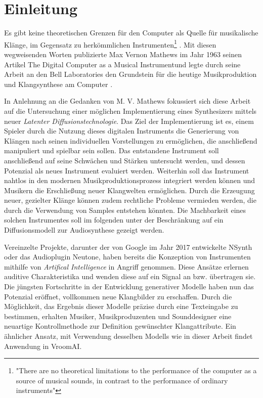 \documentclass[
  a4paper,  %
  twoside,  %
  bibliography=totoc,
  headsepline,
  cleardoublepage=empty,
  parskip=half,
  draft=false
]{scrbook}
\begin{document}
%
%


\chapter{Einleitung}
\label{sec:introduction}

\glqq Es gibt keine theoretischen Grenzen für den Computer als Quelle für musikalische Klänge, im Gegensatz zu herkömmlichen Instrumenten\grqq \footnote{"There are no theoretical limitations to the performance of the computer as a source of musical sounds, in contrast to the performance of ordinary instruments"} \cite{mathews_digital_1963}. Mit diesen wegweisenden Worten publizierte Max Vernon Mathews im Jahr 1963 seinen Artikel \glqq The Digital Computer as a Musical Instrument\grqq und legte durch seine Arbeit an den Bell Laboratories den Grundstein für die heutige Musikproduktion und Klangsynthese am Computer \cite{mathews_music_2004}.

In Anlehnung an die Gedanken von M. V. Mathews fokussiert sich diese Arbeit auf die Untersuchung einer möglichen Implementierung eines Synthesizers mittels neuer \emph{Latenter Diffusionstechnologie}. Das Ziel der Implementierung ist es, einem Spieler durch die Nutzung dieses digitalen Instruments die Generierung von Klängen nach seinen individuellen Vorstellungen zu ermöglichen, die anschließend manipuliert und spielbar sein sollen. Das entstandene Instrument soll anschließend auf seine Schwächen und Stärken untersucht werden, und dessen Potenzial als neues Instrument evaluiert werden. Weiterhin soll das Instrument nahtlos in den modernen Musikproduktionsprozess integriert werden können und Musikern die Erschließung neuer Klangwelten ermöglichen. Durch die Erzeugung neuer, gezielter Klänge können zudem rechtliche Probleme vermieden werden, die durch die Verwendung von Samples entstehen könnten. Die Machbarkeit eines solchen Instrumentes soll im folgenden unter der Beschränkung auf ein Diffusionsmodell zur Audiosynthese gezeigt werden.

Vereinzelte Projekte, darunter der von Google im Jahr 2017 entwickelte  \glqq  NSynth\grqq \cite{google_ai_nsynth_2017} oder das Audioplugin \glqq Neutone\grqq \cite{qosmo_neutone_nodate}, haben bereits die Konzeption von Instrumenten mithilfe von  \emph{Artifical Intelligence} in Angriff genommen. Diese Ansätze erlernen auditive Charakteristika und wenden diese auf ein Signal an bzw. übertragen sie. Die jüngsten Fortschritte in der Entwicklung generativer Modelle haben nun das Potenzial eröffnet, vollkommen neue Klangbilder zu erschaffen. Durch die Möglichkeit, das Ergebnis dieser Modelle präzise durch eine Texteingabe zu bestimmen, erhalten Musiker, Musikproduzenten und Sounddesigner eine neuartige Kontrollmethode zur Definition gewünschter Klangattribute. Ein ähnlicher Ansatz, mit Verwendung desselben Modells wie in dieser Arbeit findet Anwendung in \glqq VroomAI\grqq \cite{barney_hill_vroomai_2023}.
\end{document}
